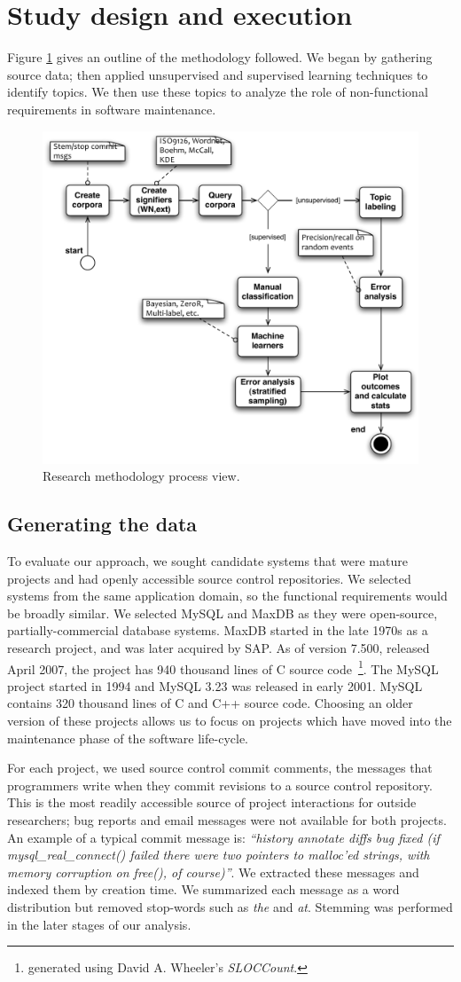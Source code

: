 \documentclass[]{sig-alternate}
\begin{document}
\section{Study design and execution}
Figure \ref{fig:process} gives an outline of the methodology followed. We began by gathering source data; then applied unsupervised and supervised learning techniques to identify topics. We then use these topics to analyze the role of non-functional requirements in software maintenance.

\begin{figure}
  \centering
 \includegraphics[width=.45\textwidth]{figures/process-model}
 \caption{Research methodology process view.}
  \label{fig:process}
\end{figure}

\subsection{Generating the data}
\label{sec:wordlist}
To evaluate our approach, we sought candidate systems that were mature projects and had openly accessible source control repositories. We selected systems from the same application domain, so the functional requirements would be broadly similar. We selected MySQL and MaxDB as they were open-source, partially-commercial database systems. MaxDB started in the late 1970s as a research project, and was later acquired by SAP. As of version 7.500, released April 2007, the project has 940 thousand lines of C source code~\footnote{generated using David A. Wheeler's \emph{SLOCCount}.}. The MySQL project started in 1994 and MySQL 3.23 was released in early 2001. MySQL contains 320 thousand lines of C and C++ source code.  Choosing an older version of these projects allows us to focus on projects which have moved into the maintenance phase of the software life-cycle.

For each project, we used source control commit comments, the messages that programmers write when they commit revisions to a source control repository. This is the most readily accessible source of project interactions for outside researchers; bug reports and email messages were not available for both projects. An example of a typical commit message is: \textit{``history annotate diffs bug fixed (if mysql\-\_real\-\_connect() failed there were two pointers to malloc'ed strings, with memory corruption on free(), of course)''}. We extracted these messages and indexed them by creation time. We summarized each message as a word distribution but removed stop-words such as \emph{the} and \emph{at}. Stemming was performed in the later stages of our analysis.
\end{document}

